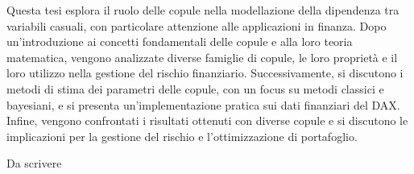 \documentclass[%
	corpo=11pt,
    twoside,
    stile=classica,
    oldstyle,
    tipotesi=custom,
    greek,
    evenboxes,
]{toptesi}
\begin{document}




\sommario%
Questa tesi esplora il ruolo delle copule nella modellazione della dipendenza tra variabili casuali, con particolare attenzione alle applicazioni in finanza. Dopo un'introduzione ai concetti fondamentali delle copule e alla loro teoria matematica, vengono analizzate diverse famiglie di copule, le loro proprietà e il loro utilizzo nella gestione del rischio finanziario. Successivamente, si discutono i metodi di stima dei parametri delle copule, con un focus su metodi classici e bayesiani, e si presenta un’implementazione pratica sui dati finanziari del DAX. Infine, vengono confrontati i risultati ottenuti con diverse copule e si discutono le implicazioni per la gestione del rischio e l’ottimizzazione di portafoglio.


\ringraziamenti%
Da scrivere



\indici%


    
\end{document}
